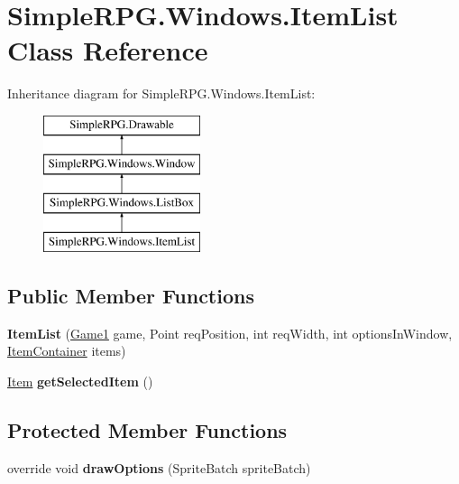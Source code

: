 \hypertarget{class_simple_r_p_g_1_1_windows_1_1_item_list}{\section{Simple\+R\+P\+G.\+Windows.\+Item\+List Class Reference}
\label{class_simple_r_p_g_1_1_windows_1_1_item_list}
}
Inheritance diagram for Simple\+R\+P\+G.\+Windows.\+Item\+List\+:\begin{figure}[H]
\begin{center}
\leavevmode
\includegraphics[height=4.000000cm]{class_simple_r_p_g_1_1_windows_1_1_item_list}
\end{center}
\end{figure}
\subsection*{Public Member Functions}
\begin{DoxyCompactItemize}
\item 
\hypertarget{class_simple_r_p_g_1_1_windows_1_1_item_list_a18f5608d7498c2c0bcefd449853a67cc}{{\bfseries Item\+List} (\hyperlink{class_simple_r_p_g_1_1_game1}{Game1} game, Point req\+Position, int req\+Width, int options\+In\+Window, \hyperlink{class_simple_r_p_g_1_1_item_container}{Item\+Container} items)}\label{class_simple_r_p_g_1_1_windows_1_1_item_list_a18f5608d7498c2c0bcefd449853a67cc}

\item 
\hypertarget{class_simple_r_p_g_1_1_windows_1_1_item_list_a3e66f13e5441ede760ea0354dcad386b}{\hyperlink{class_simple_r_p_g_1_1_item}{Item} {\bfseries get\+Selected\+Item} ()}\label{class_simple_r_p_g_1_1_windows_1_1_item_list_a3e66f13e5441ede760ea0354dcad386b}

\end{DoxyCompactItemize}
\subsection*{Protected Member Functions}
\begin{DoxyCompactItemize}
\item 
\hypertarget{class_simple_r_p_g_1_1_windows_1_1_item_list_a1a0df2d3034a3ce9dd2e98f6a1a0aed6}{override void {\bfseries draw\+Options} (Sprite\+Batch sprite\+Batch)}\label{class_simple_r_p_g_1_1_windows_1_1_item_list_a1a0df2d3034a3ce9dd2e98f6a1a0aed6}

\end{DoxyCompactItemize}
